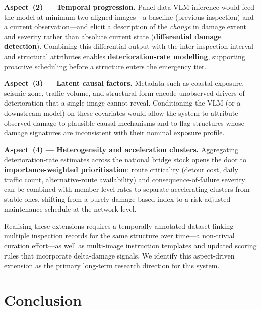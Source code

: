 \documentclass[twocolumn]{article}
\begin{document}
\textbf{Aspect~(2) — Temporal progression.}
Panel-data VLM inference would feed the model at minimum two aligned
images---a baseline (previous inspection) and a current observation---and
elicit a description of the \textit{change} in damage extent and severity
rather than absolute current state (\textbf{differential damage detection}).
Combining this differential output with the inter-inspection interval and
structural attributes enables \textbf{deterioration-rate modelling}, supporting
proactive scheduling before a structure enters the emergency tier.

\textbf{Aspect~(3) — Latent causal factors.}
Metadata such as coastal exposure, seismic zone, traffic volume, and
structural form encode unobserved drivers of deterioration that a
single image cannot reveal.
Conditioning the VLM (or a downstream model) on these covariates would
allow the system to attribute observed damage to plausible causal
mechanisms and to flag structures whose damage signatures are inconsistent
with their nominal exposure profile.

\textbf{Aspect~(4) — Heterogeneity and acceleration clusters.}
Aggregating deterioration-rate estimates across the national bridge stock
opens the door to \textbf{importance-weighted prioritisation}: route
criticality (detour cost, daily traffic count, alternative-route availability)
and consequence-of-failure severity can be combined with member-level rates
to separate accelerating clusters from stable ones, shifting from a purely
damage-based index to a risk-adjusted maintenance schedule at the network
level.

Realising these extensions requires a temporally annotated dataset linking
multiple inspection records for the same structure over time---a non-trivial
curation effort---as well as multi-image instruction templates and updated
scoring rules that incorporate delta-damage signals.
We identify this aspect-driven extension as the primary long-term research
direction for this system.

\section{Conclusion}
\label{sec:conclusion}
\end{document}
